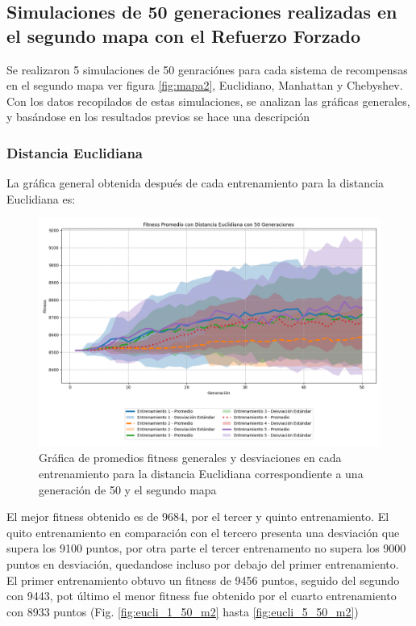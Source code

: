 \documentclass[conference]{IEEEtran}
\begin{document}
\subsection{Simulaciones de 50 generaciones realizadas en el segundo mapa con el Refuerzo Forzado}
Se realizaron 5 simulaciones de 50 genraciónes para cada sistema de recompensas en el segundo mapa ver figura \ref{fig:mapa2}, Euclidiano, Manhattan y Chebyshev. Con los datos recopilados de estas simulaciones, se analizan las gráficas generales, y basándose en los resultados previos se hace una descripción
\subsubsection{Distancia Euclidiana}
La gráfica general obtenida después de cada entrenamiento para la distancia Euclidiana es:
\begin{figure}[H]
    \centering
    \includegraphics[width=0.9\linewidth]{Euclidiana/Mapa2/Fitness_Prrm_Map2_Eucli_50Gen.png}
    \caption{Gráfica de promedios fitness generales y desviaciones en cada entrenamiento para la distancia Euclidiana correspondiente a una generación de 50 y el segundo mapa}
    \label{fig:eucli_mapa2}
\end{figure}
El mejor fitness obtenido es de 9684, por el tercer y quinto entrenamiento. El quito entrenamiento en comparación con el tercero presenta una desviación que supera los 9100 puntos, por otra parte el tercer entrenamento no supera los 9000 puntos en desviación, quedandose incluso por debajo del primer entrenamiento. El primer entrenamiento obtuvo un fitness de 9456 puntos, seguido del segundo con 9443, pot último el menor fitness fue obtenido por el cuarto entrenamiento con 8933 puntos (Fig. \ref{fig:eucli_1_50_m2} hasta \ref{fig:eucli_5_50_m2})
\end{document}
